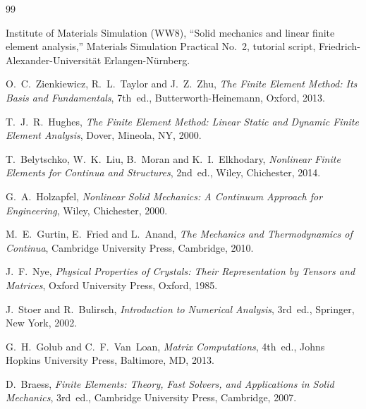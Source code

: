 \documentclass[11pt,a4paper]{article}
\numberwithin{equation}{section}
\theoremstyle{remark}
\begin{document}
\begin{thebibliography}{99}

Institute of Materials Simulation (WW8),
``Solid mechanics and linear finite element analysis,''
Materials Simulation Practical No.~2, tutorial script,
Friedrich-Alexander-Universit\"at Erlangen-N\"urnberg.

O.~C.~Zienkiewicz, R.~L.~Taylor and J.~Z.~Zhu,
\textit{The Finite Element Method: Its Basis and Fundamentals},
7th~ed.,
Butterworth-Heinemann, Oxford, 2013.

T.~J.~R.~Hughes,
\textit{The Finite Element Method: Linear Static and Dynamic Finite Element Analysis},
Dover, Mineola, NY, 2000.

T.~Belytschko, W.~K.~Liu, B.~Moran and K.~I.~Elkhodary,
\textit{Nonlinear Finite Elements for Continua and Structures},
2nd~ed.,
Wiley, Chichester, 2014.

G.~A.~Holzapfel,
\textit{Nonlinear Solid Mechanics: A Continuum Approach for Engineering},
Wiley, Chichester, 2000.

M.~E.~Gurtin, E.~Fried and L.~Anand,
\textit{The Mechanics and Thermodynamics of Continua},
Cambridge University Press, Cambridge, 2010.

J.~F.~Nye,
\textit{Physical Properties of Crystals: Their Representation by Tensors and Matrices},
Oxford University Press, Oxford, 1985.

J.~Stoer and R.~Bulirsch,
\textit{Introduction to Numerical Analysis},
3rd~ed.,
Springer, New York, 2002.

G.~H.~Golub and C.~F.~Van~Loan,
\textit{Matrix Computations},
4th~ed.,
Johns Hopkins University Press, Baltimore, MD, 2013.

D.~Braess,
\textit{Finite Elements: Theory, Fast Solvers, and Applications in Solid Mechanics},
3rd~ed.,
Cambridge University Press, Cambridge, 2007.

\end{thebibliography}
\end{document}
